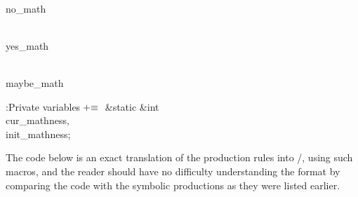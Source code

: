 \Y\B\4\D\\{no\_math}\5
\par
\B\4\D\\{yes\_math}\5
\par
\B\4\D\\{maybe\_math}\5
\par
\Y\B\4:Private variables\X${}\mathrel+\equiv{}$\6
\&{static} \&{int} \\{cur\_mathness}${},{}$ \\{init\_mathness};\par
\fi

The code below is an exact translation of the production rules into
\CEE/, using such macros, and the reader should have no difficulty
understanding the format by comparing the code with the symbolic
productions as they were listed earlier.

